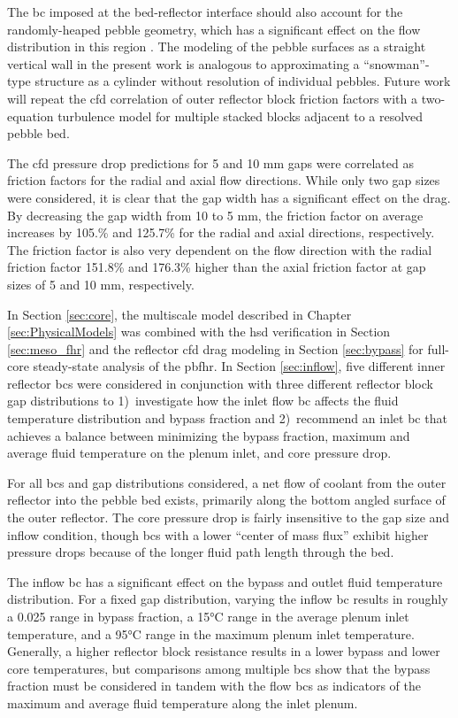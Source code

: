 The \gls{bc} imposed at the bed-reflector interface should also account for the randomly-heaped pebble geometry, which has a significant effect on the flow distribution in this region \cite{amini}. The modeling of the pebble surfaces as a straight vertical wall in the present work is analogous to approximating a ``snowman''-type structure as a cylinder without resolution of individual pebbles. Future work will repeat the \gls{cfd} correlation of outer reflector block friction factors with a two-equation turbulence model for multiple stacked blocks adjacent to a resolved pebble bed.

The \gls{cfd} pressure drop predictions for 5 and 10 \si{\milli\meter} gaps were correlated as friction factors for the radial and axial flow directions. While only two gap sizes were considered, it is clear that the gap width has a significant effect on the drag. By decreasing the gap width from 10 to 5 \si{\milli\meter}, the friction factor on average increases by 105.\% and 125.7\% for the radial and axial directions, respectively. The friction factor is also very dependent on the flow direction with the radial friction factor 151.8\% and 176.3\% higher than the axial friction factor at gap sizes of 5 and 10 \si{\milli\meter}, respectively. 

In Section \ref{sec:core}, the multiscale model described in Chapter \ref{sec:PhysicalModels} was combined with the \gls{hsd} verification in Section \ref{sec:meso_fhr} and the reflector \gls{cfd} drag modeling in Section \ref{sec:bypass} for full-core steady-state analysis of the \gls{pbfhr}. In Section \ref{sec:inflow}, five different inner reflector \glspl{bc} were considered in conjunction with three different reflector block gap distributions to 1)~investigate how the inlet flow \gls{bc} affects the fluid temperature distribution and bypass fraction and 2)~recommend an inlet \gls{bc} that achieves a balance between minimizing the bypass fraction, maximum and average fluid temperature on the plenum inlet, and core pressure drop.

For all \glspl{bc} and gap distributions considered, a net flow of coolant from the outer reflector into the pebble bed exists, primarily along the bottom angled surface of the outer reflector. The core pressure drop is fairly insensitive to the gap size and inflow condition, though \glspl{bc} with a lower ``center of mass flux'' exhibit higher pressure drops because of the longer fluid path length through the bed.

The inflow \gls{bc} has a significant effect on the bypass and outlet fluid temperature distribution. For a fixed gap distribution, varying the inflow \gls{bc} results in roughly a 0.025 range in bypass fraction, a 15\si{\celsius} range in the average plenum inlet temperature, and a 95\si{\celsius} range in the maximum plenum inlet temperature. Generally, a higher reflector block resistance results in a lower bypass and lower core temperatures, but comparisons among multiple \glspl{bc} show that the bypass fraction must be considered in tandem with the flow \glspl{bc} as indicators of the maximum and average fluid temperature along the inlet plenum. 

